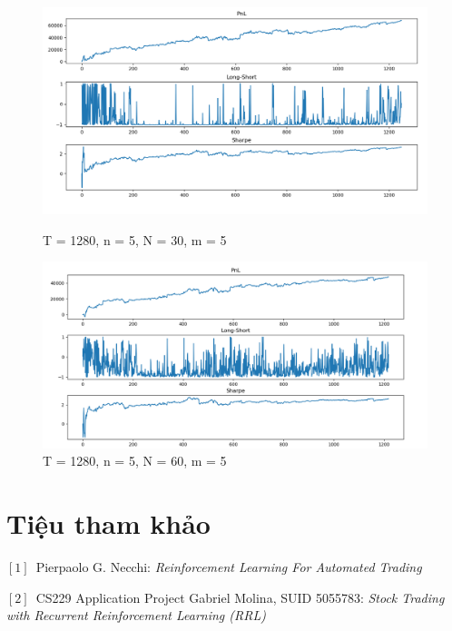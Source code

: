 \documentclass[14pt]{extreport}
\begin{document}
\begin{center}
    \begin{figure}[htp]
    \begin{center}
     \includegraphics[scale=.5]{result_1-1}
    \end{center}
    \caption{T = 1280, n = 5, N = 30, m = 5}
    \begin{center}
     \includegraphics[scale=.5]{result_2-1}
    \end{center}
    \caption{T = 1280, n = 5, N = 60, m = 5}
    \end{figure}
\end{center} 

\chapter*{Tiệu tham khảo}
\begin{flushleft}

\quad $[1]$\ Pierpaolo G. Necchi: \textit{ Reinforcement Learning For Automated Trading}

\quad $[2]$\ CS229 Application Project
Gabriel Molina, SUID 5055783: \textit{ Stock Trading with Recurrent Reinforcement
Learning (RRL)}
\end{flushleft}
\end{document}
